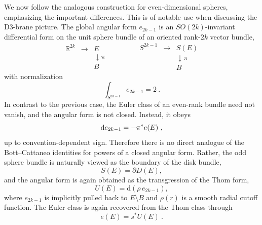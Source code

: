 \documentclass[11pt,a4paper]{article}
\theoremstyle{definition}
\theoremstyle{identity}
\theoremstyle{remark}
\newcommand{\be}{\begin{equation}}
\newcommand{\ee}{\end{equation}}
\begin{document}
We now follow the analogous construction for even-dimensional spheres, emphasizing the important differences. This is of notable use when discussing the D3-brane picture. The global angular form $e_{2k-1}$ is an $SO(2k)$-invariant differential
form on the unit sphere bundle of an oriented rank-$2k$ vector bundle,
\be
\begin{array}{ccc}
 \mathbb{R}^{2k} & \longrightarrow & E \\
 && \downarrow{\pi} \\
 && B
\end{array}
\qquad\qquad
\begin{array}{ccc}
 S^{2k-1} & \longrightarrow & S(E) \\
 && \downarrow{\pi} \\
 && B
\end{array}
\ee
with normalization
\begin{equation}
    \int_{S^{2k-1} }e_{2k-1}=2\ .
\end{equation}
In contrast to the previous case, the Euler class of an even-rank bundle need
not vanish, and the angular form is not closed. Instead, it obeys
\begin{equation}
\label{eq:oddnormalization}
    {\rm d}e_{2k-1}=-\pi^*e(E)\ ,
\end{equation}
up to convention-dependent sign. Therefore there is no direct analogue of the
Bott--Cattaneo identities for powers of a closed angular form. Rather, the odd
sphere bundle is naturally viewed as the boundary of the disk bundle,
\begin{equation}
    S(E)=\partial D(E),
\end{equation}
and the angular form is again obtained as the transgression of the Thom form,
\begin{equation}
    U(E)=\text{d}\!\left(\rho\,e_{2k-1}\right),
\end{equation}
where $e_{2k-1}$ is implicitly pulled back to $E\setminus B$ and
$\rho(r)$ is a smooth radial cutoff function. The Euler class is again recovered
from the Thom class through
\begin{equation}
    e(E)=s^*U(E)\ .
\end{equation}
\end{document}
